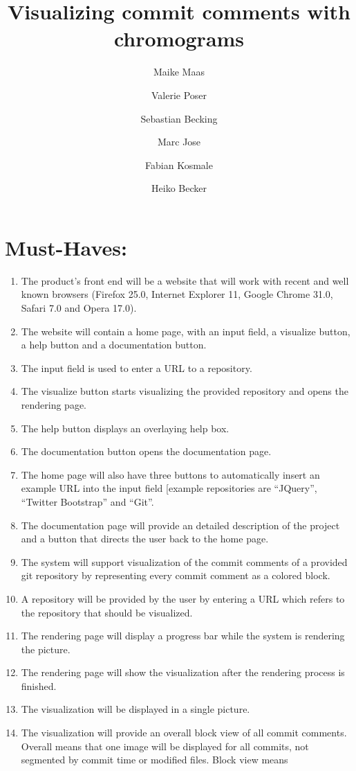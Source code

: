 \documentclass[12pt]{scrartcl}
\author{Maike Maas \and Valerie Poser \and Sebastian Becking
\and Marc Jose \and Fabian Kosmale  \and Heiko Becker}
\title{Visualizing commit comments with chromograms}
\begin{document}
\maketitle
\section{Must-Haves:}
\begin{enumerate}
\item The product's front end will be a website that will work with recent and well known browsers (Firefox 25.0, Internet Explorer 11, Google Chrome 31.0, Safari 7.0 and Opera 17.0). 
\item The website will contain a home page, with an input field, a visualize button, a help button and a documentation button.
\item The input field is used to enter a URL to a repository.
\item The visualize button starts visualizing the provided repository and opens the rendering page.
\item The help button displays an overlaying help box.
\item The documentation button opens the documentation page.
\item The home page will also have three buttons to automatically insert an example URL into the input field [example repositories are \enquote{JQuery}, \enquote{Twitter Bootstrap} and \enquote{Git}.
\item The documentation page will provide an detailed description of the project and a button that directs the user back to the home page.
\item The system will support visualization of the commit comments of a provided git repository by representing every commit comment as a colored block.
\item A repository will be provided by the user by entering a URL which refers to the repository that should be visualized.
\item The rendering page will display a progress bar while the system is rendering the picture.
\item The rendering page will show the visualization after the rendering process is finished.
\item The visualization will be displayed in a single picture.
\item The visualization will provide an overall block view of all commit
	comments. Overall means that one image will be displayed for all
	commits, not segmented by commit time or modified files. Block view means

\end{enumerate}
\end{document}
